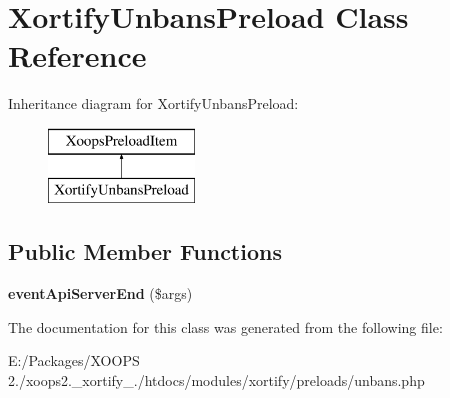\hypertarget{class_xortify_unbans_preload}{\section{Xortify\-Unbans\-Preload Class Reference}
\label{class_xortify_unbans_preload}
}
Inheritance diagram for Xortify\-Unbans\-Preload\-:\begin{figure}[H]
\begin{center}
\leavevmode
\includegraphics[height=2.000000cm]{class_xortify_unbans_preload}
\end{center}
\end{figure}
\subsection*{Public Member Functions}
\begin{DoxyCompactItemize}
\item 
\hypertarget{class_xortify_unbans_preload_a9c08e9e088954ef29b76a4e76a5d43c9}{{\bfseries event\-Api\-Server\-End} (\$args)}\label{class_xortify_unbans_preload_a9c08e9e088954ef29b76a4e76a5d43c9}

\end{DoxyCompactItemize}


The documentation for this class was generated from the following file\-:\begin{DoxyCompactItemize}
\item 
E\-:/\-Packages/\-X\-O\-O\-P\-S 2./xoops2.\-\_\-xortify\-\_./htdocs/modules/xortify/preloads/unbans.\-php\end{DoxyCompactItemize}
